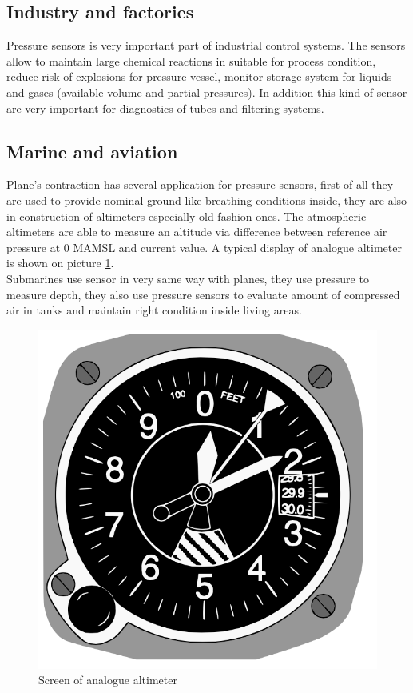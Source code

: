\documentclass[english]{article}
\begin{document}
\subsection{Industry and factories}

Pressure sensors is very important part of industrial control systems. The sensors allow to maintain large chemical reactions in suitable for process condition, reduce risk of explosions for pressure vessel, monitor storage system for liquids and gases (available volume and partial pressures). In addition this kind of sensor are very important for diagnostics of tubes and filtering systems.

\subsection{Marine and aviation} 

Plane's contraction has several application for pressure sensors, first of all they are used to provide nominal ground like breathing conditions inside, they are also in construction of altimeters especially old-fashion ones. \cite{alt} The atmospheric altimeters are able to measure an altitude via difference between reference air pressure at 0 MAMSL and current value. A typical display of analogue altimeter is shown on picture \ref{fig:alt}.\\

Submarines use sensor in very same way with planes, they use pressure to measure depth, they also use pressure sensors to evaluate amount of compressed air in tanks and maintain right condition inside living areas. \cite{app}

\begin{figure}[H]
\centerline{\includegraphics[scale=0.3]{PressureSensors/alt}}
\caption{Screen of analogue altimeter \label{fig:alt} \cite{alt}}
\end{figure}
\end{document}
